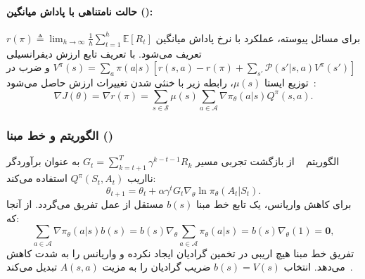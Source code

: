 \paragraph*{حالت نامتناهی با پاداش میانگین ():}
برای مسائل پیوسته، عملکرد با نرخ پاداش میانگین $r(\pi) \triangleq \lim_{h \to \infty} \frac{1}{h} \sum_{t=1}^h \mathbb{E}[R_t]$ تعریف می‌شود. با تعریف تابع ارزش دیفرانسیلی $V^\pi(s) = \sum_a \pi(a|s) [r(s,a) - r(\pi) + \sum_{s'} \mathcal{P}(s'|s,a)V^\pi(s')]$ و ضرب در توزیع ایستا $\mu(s)$، رابطه زیر با خنثی شدن تغییرات ارزش حاصل می‌شود~\cite{sutton2018reinforcement}:
\begin{equation}
\nabla J(\theta) = \nabla r(\pi) = \sum_{s \in \mathcal{S}} \mu(s) \sum_{a \in \mathcal{A}} \nabla \pi_\theta(a|s) Q^\pi(s, a).
\end{equation}

\subsubsection*{الگوریتم  و خط مبنا ()}
الگوریتم ~\cite{williams1992simple} از بازگشت تجربی مسیر $G_t = \sum_{k=t+1}^T \gamma^{k-t-1} R_k$ به عنوان برآوردگر نااریب $Q^\pi(S_t, A_t)$ استفاده می‌کند:
\begin{equation}
\theta_{t+1} = \theta_t + \alpha \gamma^t G_t \nabla_\theta \ln \pi_\theta(A_t | S_t).
\end{equation}
برای کاهش واریانس، یک تابع خط مبنا $b(s)$ مستقل از عمل تفریق می‌گردد. از آنجا که:
\begin{equation}
\sum_{a \in \mathcal{A}} \nabla \pi_\theta(a|s) b(s) = b(s) \nabla_\theta \sum_{a \in \mathcal{A}} \pi_\theta(a|s) = b(s) \nabla_\theta (1) = \mathbf{0},
\end{equation}
تفریق خط مبنا هیچ اریبی در تخمین گرادیان ایجاد نکرده و واریانس را به شدت کاهش می‌دهد. انتخاب $b(s) = V(s)$ ضریب گرادیان را به مزیت $A(s, a)$ تبدیل می‌کند~\cite{sutton2018reinforcement}.

